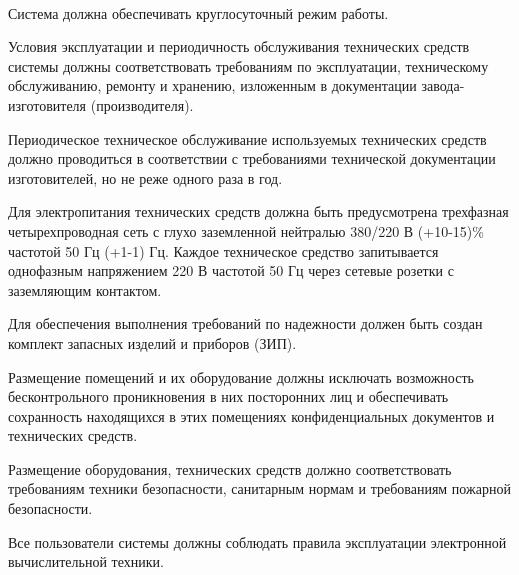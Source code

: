 \documentclass[russian, utf8, 12pt,pointsubsection,floatsubsection]{eskdtext}
\begin{document}
\\

Система должна обеспечивать круглосуточный режим работы.

Условия     эксплуатации     и	периодичность обслуживания технических средств системы должны соответствовать требованиям по эксплуатации, техническому обслуживанию, ремонту и хранению, изложенным в документации завода-изготовителя (производителя).

Периодическое техническое обслуживание используемых технических средств должно проводиться в соответствии с требованиями технической документации изготовителей, но не реже одного раза в год. 

Для электропитания технических средств должна быть предусмотрена трехфазная четырехпроводная сеть с глухо заземленной нейтралью 380/220 В (+10-15)\% частотой 50 Гц (+1-1) Гц. Каждое техническое средство запитывается однофазным напряжением 220 В частотой 50 Гц через сетевые розетки с заземляющим контактом.

Для обеспечения выполнения требований по надежности должен быть создан комплект запасных изделий и приборов (ЗИП).

Размещение помещений и их оборудование должны исключать возможность бесконтрольного проникновения в них посторонних лиц и обеспечивать сохранность находящихся в этих помещениях конфиденциальных документов и технических средств.

Размещение оборудования, технических средств должно соответствовать требованиям техники безопасности, санитарным нормам и требованиям пожарной безопасности.

Все пользователи системы должны соблюдать правила эксплуатации электронной вычислительной техники.
\end{document}

